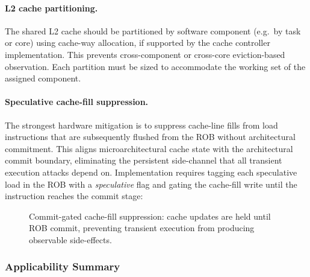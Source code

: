 \paragraph{L2 cache partitioning.}
The shared \mbox{L2} cache should be partitioned by software component (e.g.\ by
task or core) using cache-way allocation, if supported by the cache controller
implementation.  This prevents cross-component or cross-core eviction-based
observation.  Each partition must be sized to accommodate the working set of the
assigned component.

\paragraph{Speculative cache-fill suppression.}
The strongest hardware mitigation is to suppress cache-line fills from load
instructions that are subsequently flushed from the ROB without architectural
commitment.  This aligns microarchitectural cache state with the architectural
commit boundary, eliminating the persistent side-channel that all transient
execution attacks depend on.  Implementation requires tagging each speculative
load in the ROB with a \emph{speculative} flag and gating the cache-fill write
until the instruction reaches the commit stage:

\begin{figure}[h]
\centering
{}
\caption{Commit-gated cache-fill suppression: cache updates are held until
ROB commit, preventing transient execution from producing observable side-effects.}
\label{fig:cache_suppression}
\end{figure}

\subsubsection{Applicability Summary}

